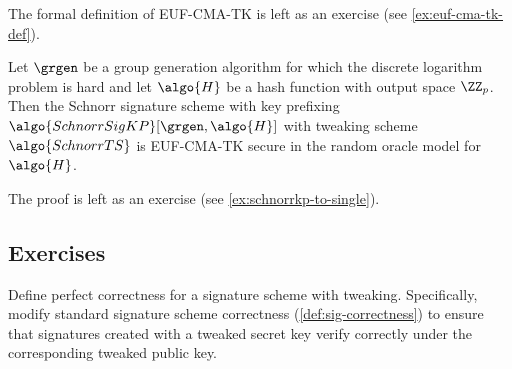 The formal definition of EUF-CMA-TK is left as an exercise (see \autoref{ex:euf-cma-tk-def}).

\begin{theorem}\label{thm:schnorrkp-euf-cma-tk}
  Let $\grgen$ be a group generation algorithm for which the discrete logarithm problem is hard and let $\algo{H}$ be a hash function with output space $\ZZ_p$.
  Then the Schnorr signature scheme with key prefixing $\algo{SchnorrSigKP}[\grgen, \algo{H}]$ with tweaking scheme $\algo{SchnorrTS}$ is EUF-CMA-TK secure in the random oracle model for $\algo{H}$.
\end{theorem}

The proof is left as an exercise (see \autoref{ex:schnorrkp-to-single}).

\subsection{Exercises}

\begin{exercise}
  Define perfect correctness for a signature scheme with tweaking.
  Specifically, modify standard signature scheme correctness (\autoref{def:sig-correctness}) to ensure that signatures created with a tweaked secret key verify correctly under the corresponding tweaked public key.
\end{exercise}


